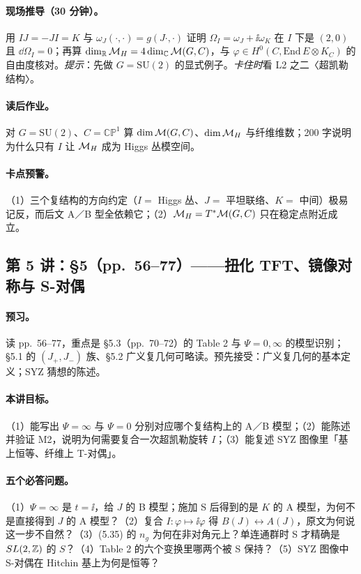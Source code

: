 {\paragraph{现场推导（30 分钟）。}用 \(IJ=-JI=K\) 与 \(\omega_J(\cdot,\cdot)=g(J\cdot,\cdot)\) 证明 \(\Omega_I=\omega_J+\ii\omega_K\) 在 \(I\) 下是 \((2,0)\) 且 \(\dd\Omega_I=0\)；再算 \(\dim_{\mathbb{R}}\mathcal{M}_H=4\dim_{\mathbb{C}}\mathcal{M}(G,C)\)，与 \(\varphi\in H^{0}(C,\mathrm{End}\,E\otimes K_C)\) 的自由度核对。\emph{提示}：先做 \(G=\mathrm{SU}(2)\) 的显式例子。\emph{卡住时}看 L2 之二〈超凯勒结构〉。\pC

\paragraph{读后作业。}对 \(G=\mathrm{SU}(2)\)、\(C=\mathbb{CP}^1\) 算 \(\dim\mathcal{M}(G,C)\)、\(\dim\mathcal{M}_H\) 与纤维维数；200 字说明为什么只有 \(I\) 让 \(\mathcal{M}_H\) 成为 Higgs 丛模空间。\pC

\paragraph{卡点预警。}（1）三个复结构的方向约定（\(I=\) Higgs 丛、\(J=\) 平坦联络、\(K=\) 中间）极易记反，而后文 A／B 型全依赖它；（2）\(\mathcal{M}_H=T^*\mathcal{M}(G,C)\) 只在稳定点附近成立。\pC

\subsection{第 5 讲：\S5（pp.~56--77）——扭化 TFT、镜像对称与 S-对偶}

\paragraph{预习。}读 pp.~56--77，重点是 §5.3（pp.~70--72）的 Table 2 与 \(\Psi=0,\infty\) 的模型识别；§5.1 的 \((J_+,J_-)\) 族、§5.2 广义复几何可略读。预先接受：广义复几何的基本定义；SYZ 猜想的陈述。\pC

\paragraph{本讲目标。}（1）能写出 \(\Psi=\infty\) 与 \(\Psi=0\) 分别对应哪个复结构上的 A／B 模型；（2）能陈述并验证 M2，说明为何需要复合一次超凯勒旋转 \(I\)；（3）能复述 SYZ 图像里「基上恒等、纤维上 T-对偶」。\pC

\paragraph{五个必答问题。}（1）\(\Psi=\infty\) 是 \(t=\ii\)，给 \(J\) 的 B 模型；施加 S 后得到的是 \(K\) 的 A 模型，为何不是直接得到 \(J\) 的 A 模型？（2）复合 \(I:\varphi\mapsto\ii\varphi\) 得 \(B(J)\leftrightarrow A(J)\)，原文为何说这一步不自然？（3）(5.35) 的 \(n_g\) 为何在非对角元上？单连通群时 S 才精确是 \(SL(2,\mathbb{Z})\) 的 \(S\)？（4）Table 2 的六个变换里哪两个被 S 保持？（5）SYZ 图像中 S-对偶在 Hitchin 基上为何是恒等？\pC

}
